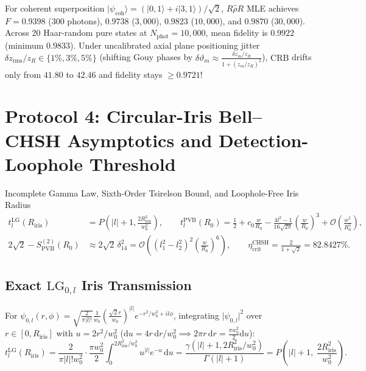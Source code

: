 \documentclass[10pt,letterpaper]{article}
\newcommand{\ket}[1]{\lvert #1 \rangle}
\newcommand{\abs}[1]{\lvert #1 \rvert}
\newcommand{\dd}{\mathrm{d}}
\numberwithin{equation}{section}
\begin{document}
\begin{pencheck}
For coherent superposition $\ket{\psi_{\mathrm{coh}}} = (\ket{0,1}+i\ket{3,1})/\sqrt{2}$, $R\hat{\rho}R$ MLE achieves $F = 0.9398$ ($300$ photons), $0.9738$ ($3{,}000$), $\mathbf{0.9823}$ ($10{,}000$), and $0.9870$ ($30{,}000$). Across 20 Haar-random pure states at $N_{\mathrm{phot}} = 10{,}000$, mean fidelity is $\mathbf{0.9922}$ (minimum $0.9833$). Under uncalibrated axial plane positioning jitter $\delta z_{\mathrm{rms}}/z_R \in \{1\%, 3\%, 5\%\}$ (shifting Gouy phases by $\delta\vartheta_m \approx \frac{\delta z_m/z_R}{1 + (z_m/z_R)^2}$), $\mathrm{CRB}$ drifts only from $41.80$ to $42.46$ and fidelity stays $\ge \mathbf{0.9721}$!
\end{pencheck}

\section{Protocol 4: Circular-Iris Bell--CHSH Asymptotics and Detection-Loophole Threshold}
\label{sec:p2_chsh}

\begin{targeteq}{Incomplete Gamma Law, Sixth-Order Tsirelson Bound, and Loophole-Free Iris Radius}
\begin{align*}
  t_l^{\mathrm{LG}}(R_{\mathrm{iris}}) &= P\!\left(\abs{l}+1, \frac{2R_{\mathrm{iris}}^2}{w_0^2}\right), \qquad
  t_l^{\mathrm{PVB}}(R_0) = \frac{1}{2} + c_0\frac{w}{R_0} - \frac{4l^2 - 1}{16\sqrt{2\pi}}\left(\frac{w}{R_0}\right)^3 + \mathcal{O}\!\left(\frac{w^5}{R_0^5}\right), \\
  2\sqrt{2} - S_{\mathrm{PVB}}^{(2)}(R_0) &\approx 2\sqrt{2}\,\delta_{14}^2 = \mathcal{O}\!\left((l_1^2-l_2^2)^2\left(\frac{w}{R_0}\right)^6\right), \qquad \eta_{\mathrm{crit}}^{\mathrm{CHSH}} = \frac{2}{1+\sqrt{2}} = 82.8427\%.
\end{align*}
\end{targeteq}

\subsection{Exact $\mathrm{LG}_{0,l}$ Iris Transmission}
For $\psi_{0,l}(r,\phi) = \sqrt{\frac{2}{\pi\abs{l}!}}\frac{1}{w_0}(\frac{\sqrt{2}r}{w_0})^{\abs{l}} e^{-r^2/w_0^2 + il\phi}$, integrating $\abs{\psi_{0,l}}^2$ over $r \in [0, R_{\mathrm{iris}}]$ with $u = 2r^2/w_0^2$ ($\dd u = 4r\,\dd r/w_0^2 \implies 2\pi r\,\dd r = \frac{\pi w_0^2}{2}\dd u$):
\begin{equation}
  t_l^{\mathrm{LG}}(R_{\mathrm{iris}}) = \frac{2}{\pi\abs{l}! w_0^2}\cdot\frac{\pi w_0^2}{2}\int_0^{2R_{\mathrm{iris}}^2/w_0^2} u^{\abs{l}} e^{-u}\,\dd u = \frac{\gamma(\abs{l}+1, 2R_{\mathrm{iris}}^2/w_0^2)}{\Gamma(\abs{l}+1)} = P\!\left(\abs{l}+1,\;\frac{2R_{\mathrm{iris}}^2}{w_0^2}\right).
\end{equation}
\end{document}
